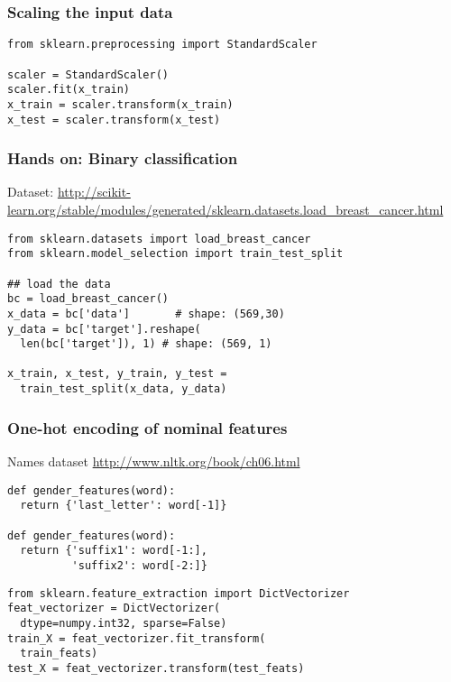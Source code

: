 \documentclass{beamer}
\begin{document}
\begin{frame}[fragile]
\frametitle{Scaling the input data}

\begin{lstlisting}
from sklearn.preprocessing import StandardScaler

scaler = StandardScaler()
scaler.fit(x_train)
x_train = scaler.transform(x_train)
x_test = scaler.transform(x_test)
\end{lstlisting}
\end{frame}

\begin{frame}[fragile]
\frametitle{Hands on: Binary classification}

Dataset: \url{http://scikit-learn.org/stable/modules/generated/sklearn.datasets.load_breast_cancer.html}

\begin{lstlisting}
from sklearn.datasets import load_breast_cancer
from sklearn.model_selection import train_test_split

## load the data
bc = load_breast_cancer()
x_data = bc['data']       # shape: (569,30)
y_data = bc['target'].reshape(
  len(bc['target']), 1) # shape: (569, 1)

x_train, x_test, y_train, y_test =
  train_test_split(x_data, y_data)

\end{lstlisting}
\end{frame}

\begin{frame}[fragile]
\frametitle{One-hot encoding of nominal features}
Names dataset
\url{http://www.nltk.org/book/ch06.html}

\begin{lstlisting}
def gender_features(word):
  return {'last_letter': word[-1]}

def gender_features(word):
  return {'suffix1': word[-1:],
          'suffix2': word[-2:]}
\end{lstlisting}
\pause
\vspace{-1.5ex}

\begin{lstlisting}
from sklearn.feature_extraction import DictVectorizer
feat_vectorizer = DictVectorizer(
  dtype=numpy.int32, sparse=False)
train_X = feat_vectorizer.fit_transform(
  train_feats)
test_X = feat_vectorizer.transform(test_feats)
\end{lstlisting}
\end{frame}
\end{document}
